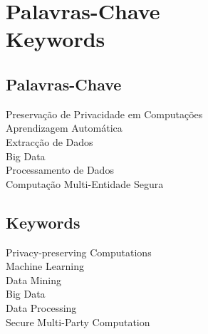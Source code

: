 %

\chapter*{Palavras-Chave \\ Keywords}
\thispagestyle{empty}

\section*{Palavras-Chave} %
{\large

Preserva\c{c}\~{a}o de Privacidade em Computa\c{c}\~{o}es      \\
Aprendizagem Autom\'{a}tica         \\
Extrac\c{c}\~{a}o de Dados          \\
Big Data                                \\
Processamento de Dados                  \\
Computa\c{c}\~{a}o Multi-Entidade Segura \\
}

\section*{Keywords} %
{\large
Privacy-preserving Computations\\
Machine Learning               \\
Data Mining					   \\
Big Data 					   \\
Data Processing                \\
Secure Multi-Party Computation \\
}

\vfill

\cleardoublepage
